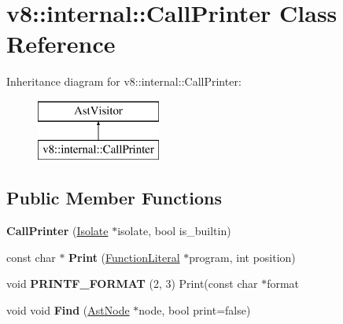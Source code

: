 \hypertarget{classv8_1_1internal_1_1_call_printer}{}\section{v8\+:\+:internal\+:\+:Call\+Printer Class Reference}
\label{classv8_1_1internal_1_1_call_printer}
Inheritance diagram for v8\+:\+:internal\+:\+:Call\+Printer\+:\begin{figure}[H]
\begin{center}
\leavevmode
\includegraphics[height=2.000000cm]{classv8_1_1internal_1_1_call_printer}
\end{center}
\end{figure}
\subsection*{Public Member Functions}
\begin{DoxyCompactItemize}
\item 
{\bfseries Call\+Printer} (\hyperlink{classv8_1_1internal_1_1_isolate}{Isolate} $\ast$isolate, bool is\+\_\+builtin)\hypertarget{classv8_1_1internal_1_1_call_printer_aab42d7d1ca289632fa909ba4511cc79e}{}\label{classv8_1_1internal_1_1_call_printer_aab42d7d1ca289632fa909ba4511cc79e}

\item 
const char $\ast$ {\bfseries Print} (\hyperlink{classv8_1_1internal_1_1_function_literal}{Function\+Literal} $\ast$program, int position)\hypertarget{classv8_1_1internal_1_1_call_printer_a355e21c6cbf16f1160b45a10af8ed153}{}\label{classv8_1_1internal_1_1_call_printer_a355e21c6cbf16f1160b45a10af8ed153}

\item 
void {\bfseries P\+R\+I\+N\+T\+F\+\_\+\+F\+O\+R\+M\+AT} (2, 3) Print(const char $\ast$format\hypertarget{classv8_1_1internal_1_1_call_printer_af18a5932dd3e1311a595dd252126deaa}{}\label{classv8_1_1internal_1_1_call_printer_af18a5932dd3e1311a595dd252126deaa}

\item 
void void {\bfseries Find} (\hyperlink{classv8_1_1internal_1_1_ast_node}{Ast\+Node} $\ast$node, bool print=false)\hypertarget{classv8_1_1internal_1_1_call_printer_ac29693bea8db76928a1bc4eea42b05ba}{}\label{classv8_1_1internal_1_1_call_printer_ac29693bea8db76928a1bc4eea42b05ba}

\end{DoxyCompactItemize}
